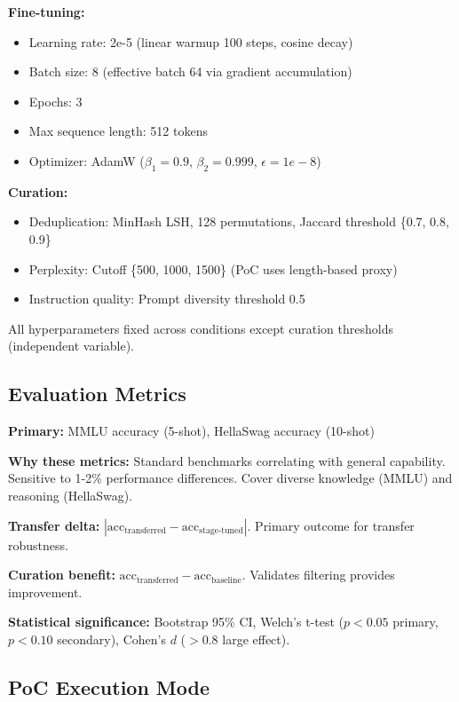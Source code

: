 \textbf{Fine-tuning:}
\begin{itemize}
\item Learning rate: 2e-5 (linear warmup 100 steps, cosine decay)
\item Batch size: 8 (effective batch 64 via gradient accumulation)
\item Epochs: 3
\item Max sequence length: 512 tokens
\item Optimizer: AdamW ($\beta_1=0.9$, $\beta_2=0.999$, $\epsilon=1e-8$)
\end{itemize}

\textbf{Curation:}
\begin{itemize}
\item Deduplication: MinHash LSH, 128 permutations, Jaccard threshold \{0.7, 0.8, 0.9\}
\item Perplexity: Cutoff \{500, 1000, 1500\} (PoC uses length-based proxy)
\item Instruction quality: Prompt diversity threshold 0.5
\end{itemize}

All hyperparameters fixed across conditions except curation thresholds (independent variable).

\subsection{Evaluation Metrics}

\textbf{Primary:} MMLU accuracy (5-shot), HellaSwag accuracy (10-shot)

\textbf{Why these metrics:} Standard benchmarks correlating with general capability. Sensitive to 1-2\% performance differences. Cover diverse knowledge (MMLU) and reasoning (HellaSwag).

\textbf{Transfer delta:} $|\text{acc}_\text{transferred} - \text{acc}_\text{stage-tuned}|$. Primary outcome for transfer robustness.

\textbf{Curation benefit:} $\text{acc}_\text{transferred} - \text{acc}_\text{baseline}$. Validates filtering provides improvement.

\textbf{Statistical significance:} Bootstrap 95\% CI, Welch's t-test ($p < 0.05$ primary, $p < 0.10$ secondary), Cohen's $d$ ($> 0.8$ large effect).

\subsection{PoC Execution Mode}

